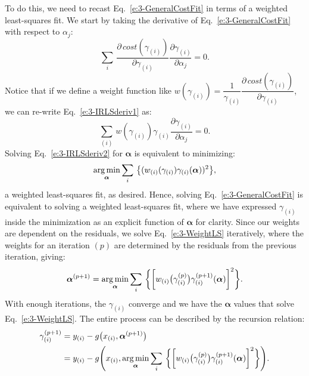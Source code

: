 To do this, we need to recast Eq.~\ref{e:3-GeneralCostFit} in terms of a weighted least-squares fit.
We start by taking the derivative of Eq.~\ref{e:3-GeneralCostFit} with respect to $\alpha_j$:
\begin{equation}
  \sum\limits_i\,\frac{\partial \, \mathit{cost}(\gamma_{(i)})}{\partial \gamma_{(i)}} \frac{\partial \gamma_{(i)}}{\partial \alpha_j} = 0.\label{e:3-IRLSderiv1}
\end{equation}
Notice that if we define a weight function like $w(\gamma_{(i)}) = \dfrac{1}{\gamma_{(i)}}\dfrac{\partial \, \mathit{cost}(\gamma_{(i)})}{\partial \gamma_{(i)}}$, we can re-write Eq.~\ref{e:3-IRLSderiv1} as:
\begin{equation}
  \sum\limits_{(i)}\,w(\gamma_{(i)}) \gamma_{(i)} \frac{\partial \gamma_{(i)}}{\partial \alpha_j} = 0.\label{e:3-IRLSderiv2}
\end{equation}
 Solving Eq.~\ref{e:3-IRLSderiv2} for $\bm{\alpha}$ is equivalent to minimizing:
 \begin{equation}
   \operatorname*{arg\,min}_{\bm{\alpha}} \sum\limits_i\,\big \{ (w_{(i)}(\gamma_{(i)}) \gamma_{(i)}(\bm{\alpha}))^2 \big \},\label{e:3-WeightLS}
 \end{equation}
 a weighted least-squares fit, as desired.
Hence, solving Eq.~\ref{e:3-GeneralCostFit} is equivalent to solving a weighted least-squares fit, where we have expressed $\gamma_{(i)}$ inside the minimization as an explicit function of $\bm{\alpha}$ for clarity.
Since our weights are dependent on the residuals, we solve Eq.~\ref{e:3-WeightLS} iteratively, where the weights for an iteration $(p)$ are determined by the residuals from the previous iteration, giving:
\begin{equation}
  \bm{\alpha}^{(p+1)} = \operatorname*{arg\,min}_{\bm{\alpha}} \sum\limits_i\,\bigg \{ \bigg [w_{(i)} \big(\gamma_{(i)}^{(p)}\big ) \gamma^{(p+1)}_{(i)}(\bm{\alpha}) \bigg ]^2 \bigg \}.
\end{equation}
With enough iterations, the $\gamma_{(i)}$ converge and we have the $\bm{\alpha}$ values that solve Eq.~\ref{e:3-WeightLS}.
The entire process can be described by the recursion relation:
\begin{align}
  \gamma_{(i)}^{(p+1)}
  &= y_{(i)} - g\big (x_{(i)},\bm{\alpha}^{(p+1)}\big ) \nonumber \\
  &= y_{(i)} - g\Bigg (x_{(i)}, \operatorname*{arg\,min}_{\bm{\alpha}} \sum\limits_i\,\bigg \{ \bigg [w_{(i)} \big(\gamma_{(i)}^{(p)}\big ) \gamma^{(p+1)}_{(i)}(\bm{\alpha}) \bigg ]^2 \bigg \} \Bigg).
\end{align}


